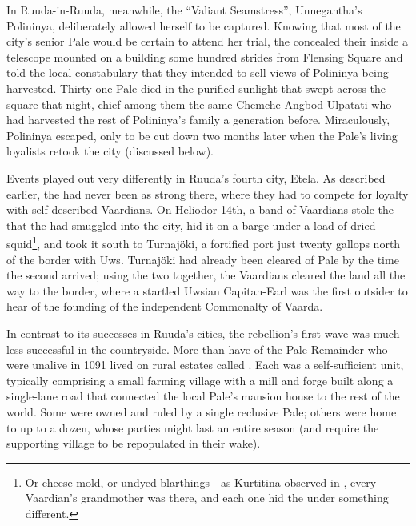 \documentclass[12pt]{report}
\begin{document}
In Ruuda-in-Ruuda, meanwhile, the ``Valiant Seamstress'', Unnegantha's
Polininya, deliberately allowed herself to be captured.  Knowing that
most of the city's senior Pale would be certain to attend her trial,
the {\aemott} concealed their  inside a telescope
mounted on a building some hundred strides from Flensing Square and
told the local constabulary that they intended to sell views of
Polininya being harvested.  Thirty-one Pale died in the purified
sunlight that swept across the square that night, chief among them the
same Chemche Angbod Ulpatati who had harvested the rest of Polininya's
family a generation before.  Miraculously, Polininya escaped, only to
be cut down two months later when the Pale's living loyalists retook
the city (discussed below).

Events played out very differently in Ruuda's fourth city, Etela.  As
described earlier, the {\aemott} had never been as strong there, where
they had to compete for loyalty with self-described Vaardians.  On
Heliodor 14th, a band of Vaardians stole the  that
the {\aemott} had smuggled into the city, hid it on a barge under a
load of dried squid\footnote{Or cheese mold, or undyed blarthings---as
Kurtitina observed in ,
every Vaardian's grandmother was there, and each one hid the
 under something different.}, and took it south to
Turnaj\"{o}ki, a fortified port just twenty gallops north of the
border with Uws.  Turnaj\"{o}ki had already been cleared of Pale by
the time the second  arrived; using the two
together, the Vaardians cleared the land all the way to the border,
where a startled Uwsian Capitan-Earl was the first outsider to hear of
the founding of the independent Commonalty of Vaarda.

In contrast to its successes in Ruuda's cities, the rebellion's first
wave was much less successful in the countryside.  More than have of
the Pale Remainder who were unalive in 1091 lived on rural estates
called .  Each  was a self-sufficient
unit, typically comprising a small farming village with a mill and
forge built along a single-lane road that connected the local Pale's
mansion house to the rest of the world.  Some were owned and ruled by
a single reclusive Pale; others were home to up to a dozen, whose
parties might last an entire season (and require the supporting
village to be repopulated in their wake).
\end{document}
